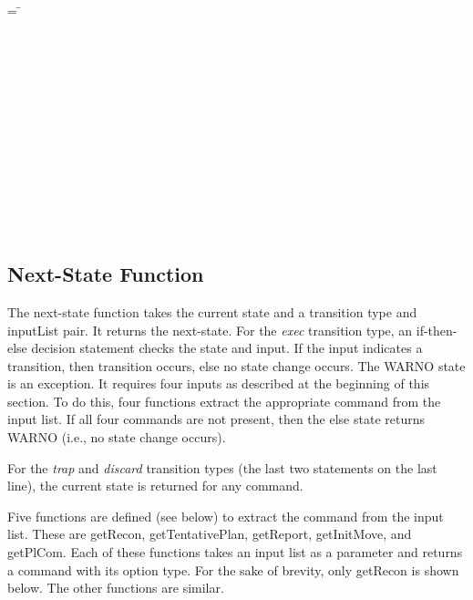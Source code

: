 \documentclass[../../main/main.tex]{subfiles}
\begin{document}
\begin{tabbing}
\parskip=8pt
 =  \= \\
					\>\HOLTokenBar{}  \\
					\>\HOLTokenBar{}  \\
					\>\HOLTokenBar{} \\
         				\>\HOLTokenBar{}  \\
					\>\HOLTokenBar{}  \\
					\>\HOLTokenBar{}  \\
					\>\HOLTokenBar{} \\
         				\>\HOLTokenBar{}  \\
					\>\HOLTokenBar{}  \\
					\>\HOLTokenBar{}  \\
					\>\HOLTokenBar{} \\
         				\>\HOLTokenBar{}  \\
					\>\HOLTokenBar{} 
\parskip=18pt
\end{tabbing}

\subsection{Next-State Function}
The next-state function takes the current state and a transition type and inputList pair.  It returns the next-state.  For the \textit{exec} transition type, an if-then-else decision statement checks the state and input.  If the input indicates a transition, then transition occurs, else no state change occurs.  The WARNO state is an exception.  It requires four inputs as described at the beginning of this section. To do this, four functions extract the appropriate command from the input list.  If all four commands are not present, then the else state returns WARNO (i.e., no state change occurs).

For the \textit{trap} and \textit{discard} transition types (the last two statements on the last line), the current state is returned for any command. 

\HOLssmPlanPBTheoremsplanPBNSXXdef

Five functions are defined (see below) to extract the command from the input list.  These are getRecon, getTentativePlan, getReport, getInitMove, and getPlCom.  Each of these functions takes an input list as a parameter and returns a command with its option type.  For the sake of brevity, only getRecon is shown below.  The other functions are similar.
\end{document}
